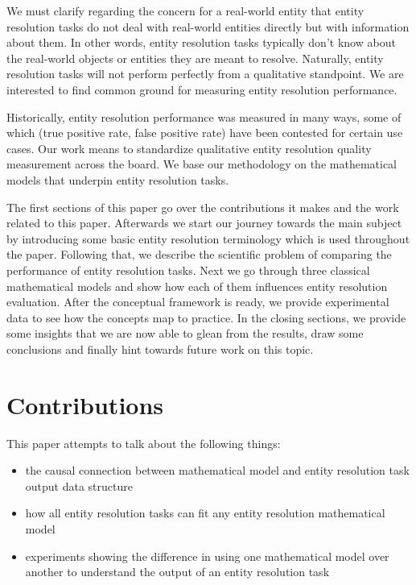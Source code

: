 \documentclass[lettersize,journal]{IEEEtran}
\begin{document}
    We must clarify regarding the concern for a real-world entity that entity
    resolution tasks do not deal with real-world entities directly but with
    information about them\cite{Tal11}.
    In other words, entity resolution tasks typically don't know about the
    real-world objects or entities they are meant to resolve\cite{Chen09}.
    Naturally, entity resolution tasks will not perform perfectly from a
    qualitative standpoint.
    We are interested to find common ground for measuring entity resolution
    performance.
    
    Historically, entity resolution performance was measured in many ways, some
    of which (true positive rate, false positive rate) have been contested for
    certain use cases\cite{Goga2015}.
    Our work means to standardize qualitative entity resolution quality
    measurement across the board.
    We base our methodology on the mathematical models that underpin entity
    resolution tasks.

    The first sections of this paper go over the contributions it makes and the
    work related to this paper.
    Afterwards we start our journey towards the main subject by introducing some
    basic entity resolution terminology which is used throughout the paper.
    Following that, we describe the scientific problem of comparing the
    performance of entity resolution tasks.
    Next we go through three classical mathematical models and show how each of
    them influences entity resolution evaluation.
    After the conceptual framework is ready, we provide experimental data to see
    how the concepts map to practice.
    In the closing sections, we provide some insights that we are now able to 
    glean from the results, draw some conclusions and finally hint towards
    future work on this topic.

    \section{Contributions}\label{sec:contributions}

    This paper attempts to talk about the following things:

    \begin{itemize}
        \item the causal connection between mathematical model and entity
        resolution task output data structure
        \item how all entity resolution tasks can fit any entity resolution
        mathematical model
        \item experiments showing the difference in using one mathematical model
        over another to understand the output of an entity resolution task
    \end{itemize}
\end{document}
